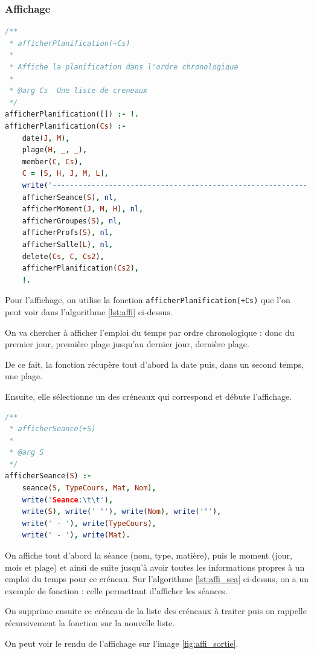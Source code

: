\subsubsection{Affichage}
\begin{lstlisting}[language=Prolog, caption=Affichage, captionpos=b,
label={lst:affi}]
/**
 * afficherPlanification(+Cs)
 *
 * Affiche la planification dans l'ordre chronologique
 *
 * @arg Cs  Une liste de creneaux
 */
afficherPlanification([]) :- !.
afficherPlanification(Cs) :-
    date(J, M),
    plage(H, _, _),
    member(C, Cs),
    C = [S, H, J, M, L],
    write('--------------------------------------------------------------'), nl,
    afficherSeance(S), nl,
    afficherMoment(J, M, H), nl,
    afficherGroupes(S), nl,
    afficherProfs(S), nl,
    afficherSalle(L), nl,
    delete(Cs, C, Cs2),
    afficherPlanification(Cs2),
    !.
\end{lstlisting}

Pour l'affichage, on utilise la fonction \texttt{afficherPlanification(+Cs)} que l'on peut voir dans l'algorithme \ref{lst:affi} ci-dessus.

On va chercher à afficher l'emploi du temps par ordre chronologique : donc du premier jour, première plage jusqu'au dernier jour, dernière plage.

De ce fait, la fonction récupère tout d'abord la date puis, dans un second
temps, une plage.

Ensuite, elle sélectionne un des créneaux qui correspond et débute l'affichage.

\begin{lstlisting}[language=Prolog, caption=Affichage, captionpos=b,
label={lst:affi_sea}]
/**
 * afficherSeance(+S)
 *
 * @arg S
 */
afficherSeance(S) :-
    seance(S, TypeCours, Mat, Nom),
    write('Seance:\t\t'),
    write(S), write(' "'), write(Nom), write('"'),
    write(' - '), write(TypeCours),
    write(' - '), write(Mat).
\end{lstlisting}

On affiche tout d'abord la séance (nom,
type, matière), puis le moment (jour, mois et plage) et ainsi de suite jusqu'à avoir toutes les informations propres à un emploi du temps pour ce créneau.
Sur l'algorithme \ref{lst:affi_sea} ci-dessus, on a un exemple de fonction : celle permettant d'afficher les séances.

On supprime ensuite ce créneau de la liste des créneaux à traiter puis on
rappelle récursivement la fonction sur la nouvelle liste.

On peut voir le rendu de l'affichage sur l'image \ref{fig:affi_sortie}.

